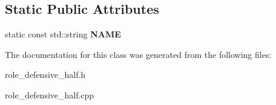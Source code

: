 \subsection*{Static Public Attributes}
\begin{DoxyCompactItemize}
\item 
\hypertarget{classRoleDefensiveHalf_a756e5d27d4db25475b9f7c46f8f3c14b}{
static const std::string {\bfseries NAME}}
\label{classRoleDefensiveHalf_a756e5d27d4db25475b9f7c46f8f3c14b}

\end{DoxyCompactItemize}


The documentation for this class was generated from the following files:\begin{DoxyCompactItemize}
\item 
role\_\-defensive\_\-half.h\item 
role\_\-defensive\_\-half.cpp\end{DoxyCompactItemize}
